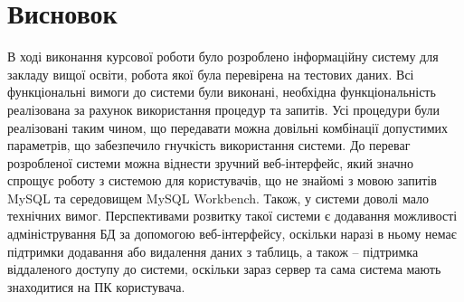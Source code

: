 \newpage
\chapter{Висновок}
В ході виконання курсової роботи було розроблено інформаційну систему для закладу
вищої освіти, робота якої була перевірена на тестових даних.
Всі функціональні вимоги до системи були виконані, необхідна функціональність реалізована за рахунок 
використання процедур та запитів.
Усі процедури були реалізовані таким чином, що передавати можна довільні комбінації
допустимих параметрів, що забезпечило гнучкість використання системи.
До переваг розробленої системи можна віднести зручний веб-інтерфейс, який значно спрощує
роботу з системою для користувачів, що не знайомі з мовою запитів MySQL та середовищем
MySQL Workbench. Також, у системи доволі мало технічних вимог.
Перспективами розвитку такої системи є додавання можливості адміністрування БД за допомогою
веб-інтерфейсу, оскільки наразі в ньому немає підтримки додавання або видалення даних з таблиць,
а також -- підтримка віддаленого доступу до системи, оскільки зараз сервер та сама система
мають знаходитися на ПК користувача.